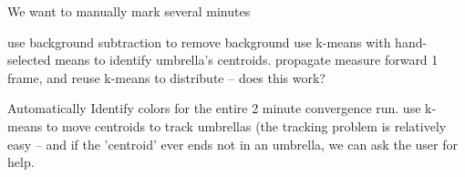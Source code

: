 
We want to manually mark several minutes

use background subtraction to remove background
use k-means with hand-selected means to identify umbrella's centroids.
propagate measure forward 1 frame, and reuse k-means to distribute -- does this work?

Automatically Identify colors for the entire 2 minute convergence run.
use k-means to move centroids to track umbrellas (the tracking problem is relatively easy -- and if the 'centroid' ever ends not in an umbrella, we can ask the user for help.

